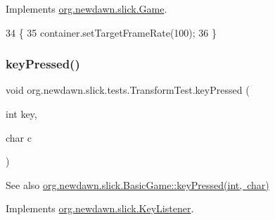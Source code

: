 Implements \mbox{\hyperlink{interfaceorg_1_1newdawn_1_1slick_1_1_game_ad2dd6affab08bb8fdb5fab0815957b7a}{org.\+newdawn.\+slick.\+Game}}.


\begin{DoxyCode}
34                                                                     \{
35         container.setTargetFrameRate(100);
36     \}
\end{DoxyCode}
\mbox{\label{classorg_1_1newdawn_1_1slick_1_1tests_1_1_transform_test_af22d2326472f2119364c3bbe40ec02db}} 
\subsubsection{\texorpdfstring{key\+Pressed()}{keyPressed()}}
{\footnotesize\ttfamily void org.\+newdawn.\+slick.\+tests.\+Transform\+Test.\+key\+Pressed (\begin{DoxyParamCaption}\item[{int}]{key,  }\item[{char}]{c }\end{DoxyParamCaption})\hspace{0.3cm}{\ttfamily [inline]}}

\begin{DoxySeeAlso}{See also}
\mbox{\hyperlink{classorg_1_1newdawn_1_1slick_1_1_basic_game_a4fbb3345b5abf5ddd54a99466d07f02f}{org.\+newdawn.\+slick.\+Basic\+Game\+::key\+Pressed(int, char)}} 
\end{DoxySeeAlso}


Implements \mbox{\hyperlink{interfaceorg_1_1newdawn_1_1slick_1_1_key_listener_ac0b0568a21ef486c4f51382614c196ef}{org.\+newdawn.\+slick.\+Key\+Listener}}.


